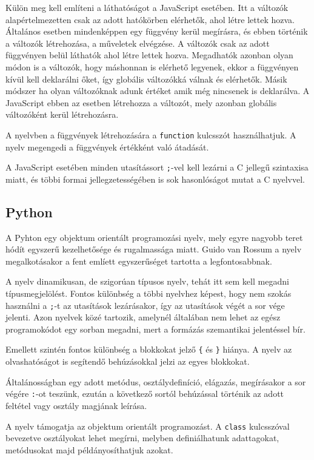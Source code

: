 Külön meg kell említeni a láthatóságot a JavaScript esetében. Itt a változók alapértelmezetten csak az adott hatókörben elérhetők, ahol létre lettek hozva. Általános esetben mindenképpen egy függvény kerül megírásra, és ebben történik a változók létrehozása, a műveletek elvégzése. A változók csak az adott függvényen belül láthatók ahol létre lettek hozva. Megadhatók azonban olyan módon is a változók, hogy máshonnan is elérhető legyenek, ekkor a függvényen kívül kell deklarálni őket, így globális változókká válnak és elérhetők. Másik módszer ha olyan változóknak adunk értéket amik még nincsenek is deklarálva. A JavaScript ebben az esetben létrehozza a változót, mely azonban globális változóként kerül létrehozásra.

A nyelvben a függvények létrehozására a \texttt{function} kulcsszót használhatjuk. A nyelv megengedi a függvények értékként való átadását.

A JavaScript esetében minden utasítássort \texttt{;}-vel kell lezárni a C jellegű szintaxisa miatt, és többi formai jellegzetességében is sok hasonlóságot mutat a C nyelvvel.

\subsection{Python}

A Pyhton egy objektum orientált programozási nyelv, mely egyre nagyobb teret hódít egyszerű kezelhetősége és rugalmassága miatt. Guido van Rossum a nyelv megalkotásakor a fent emlíett egyszerűséget tartotta a legfontosabbnak.

A nyelv dinamikusan, de szigorúan típusos nyelv, tehát itt sem kell megadni típusmegjelölést.
Fontos különbség a többi nyelvhez képest, hogy nem szokás használni a \texttt{;}-t az utasítások lezárásakor, így az utasítások végét a sor vége jelenti. Azon nyelvek közé tartozik, amelynél általában nem lehet az egész programokódot egy sorban megadni, mert a formázás szemantikai jelentéssel bír.

Emellett szintén fontos különbség a blokkokat jelző \texttt{\{} és \texttt{\}} hiánya.
A nyelv az olvashatóságot is segítendő behúzásokkal jelzi az egyes blokkokat.

Általánosságban egy adott metódus, osztálydefiníció, elágazás, megírásakor a sor végére \texttt{:}-ot teszünk, ezután a következő sortól behúzással történik az adott feltétel vagy osztály magjának leírása.

A nyelv támogatja az objektum orientált programozást. A \texttt{class} kulcsszóval bevezetve osztályokat lehet megírni, melyben definiálhatunk adattagokat, metódusokat majd példányosíthatjuk azokat.

